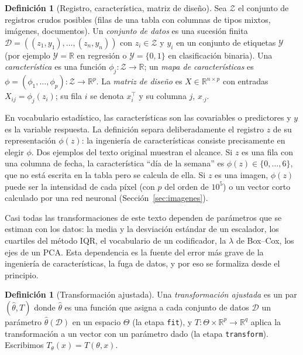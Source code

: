\documentclass[11pt]{article}
\theoremstyle{definition}
\newtheorem{definicion}[teorema]{Definición}
\theoremstyle{remark}
\newcommand{\R}{\mathbb{R}}
\begin{document}
\begin{definicion}[Registro, característica, matriz de diseño]\label{def:diseno}
\noindent Sea $\mathcal{Z}$ el conjunto de registros crudos posibles (filas de una tabla con columnas de tipos mixtos, imágenes, documentos). Un \emph{conjunto de datos} es una sucesión finita $\mathcal{D}=((z_1,y_1),\dots,(z_n,y_n))$ con $z_i\in\mathcal{Z}$ y $y_i$ en un conjunto de etiquetas $\mathcal{Y}$ (por ejemplo $\mathcal{Y}=\R$ en regresión o $\mathcal{Y}=\{0,1\}$ en clasificación binaria). Una \emph{característica} es una función $\phi_j:\mathcal{Z}\to\R$; un \emph{mapa de características} es $\phi=(\phi_1,\dots,\phi_p):\mathcal{Z}\to\R^p$. La \emph{matriz de diseño} es $X\in\R^{n\times p}$ con entradas $X_{ij}=\phi_j(z_i)$; su fila $i$ se denota $x_i^\top$ y su columna $j$, $x_{\cdot j}$.
\end{definicion}

\noindent En vocabulario estadístico, las características son las covariables o predictores y $y$ es la variable respuesta. La definición separa deliberadamente el registro $z$ de su representación $\phi(z)$: la ingeniería de características consiste precisamente en elegir $\phi$. Dos ejemplos del texto original muestran el alcance. Si $z$ es una fila con una columna de fecha, la característica ``día de la semana'' es $\phi(z)\in\{0,\dots,6\}$, que no está escrita en la tabla pero se calcula de ella. Si $z$ es una imagen, $\phi(z)$ puede ser la intensidad de cada píxel (con $p$ del orden de $10^5$) o un vector corto calculado por una red neuronal (Sección~\ref{sec:imagenes}).

\medskip

\noindent Casi todas las transformaciones de este texto dependen de parámetros que se estiman con los datos: la media y la desviación estándar de un escalador, los cuartiles del método IQR, el vocabulario de un codificador, la $\lambda$ de Box--Cox, los ejes de un PCA. Esta dependencia es la fuente del error más grave de la ingeniería de características, la fuga de datos, y por eso se formaliza desde el principio.

\begin{definicion}[Transformación ajustada]\label{def:ajustada}
\noindent Una \emph{transformación ajustada} es un par $(\hat\theta,T)$ donde $\hat\theta$ es una función que asigna a cada conjunto de datos $\mathcal{D}$ un parámetro $\hat\theta(\mathcal{D})$ en un espacio $\Theta$ (la etapa \texttt{fit}), y $T:\Theta\times\R^p\to\R^{q}$ aplica la transformación a un vector con un parámetro dado (la etapa \texttt{transform}). Escribimos $T_\theta(x)=T(\theta,x)$.
\end{definicion}
\end{document}
